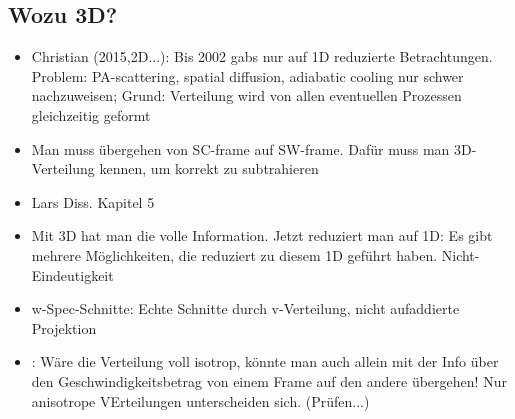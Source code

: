 \documentclass[]{article}
\begin{document}
\subsection{Wozu 3D?}
\begin{itemize}
	\item Christian (2015,2D...): Bis 2002 gabs nur auf 1D reduzierte Betrachtungen. Problem: PA-scattering, spatial diffusion, adiabatic cooling nur schwer nachzuweisen; Grund: Verteilung wird von allen eventuellen Prozessen gleichzeitig geformt
	\item Man muss übergehen von SC-frame auf SW-frame. Dafür muss man 3D-Verteilung kennen, um korrekt zu subtrahieren
	\item Lars Diss. Kapitel 5
	\item Mit 3D hat man die volle Information. Jetzt reduziert man auf 1D: Es gibt mehrere Möglichkeiten, die reduziert zu diesem 1D geführt haben. Nicht-Eindeutigkeit
	\item w-Spec-Schnitte: Echte Schnitte durch v-Verteilung, nicht aufaddierte Projektion
	\item \cite{drews_2015}: Wäre die Verteilung voll isotrop, könnte man auch allein mit der Info über den Geschwindigkeitsbetrag von einem Frame auf den andere übergehen! Nur anisotrope VErteilungen unterscheiden sich. (Prüfen...)
\end{itemize}
%
\end{document}
